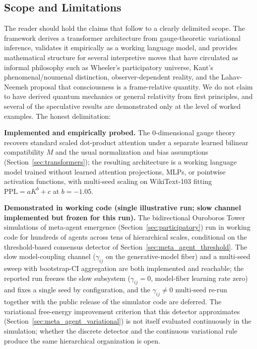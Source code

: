 \documentclass[11pt]{article}
\begin{document}
\subsection{Scope and Limitations}
\label{sec:scope_limitations}

The reader should hold the claims that follow to a clearly delimited scope. The framework derives a transformer architecture from gauge-theoretic variational inference, validates it empirically as a working language model, and provides mathematical structure for several interpretive moves that have circulated as informal philosophy such as  Wheeler's participatory universe, Kant's phenomenal/noumenal distinction, observer-dependent reality, and the Lahav-Neemeh proposal that consciousness is a frame-relative quantity. We do not claim to have derived quantum mechanics or general relativity from first principles, and several of the speculative results are demonstrated only at the level of worked examples. The honest delimitation:

\textbf{Implemented and empirically probed.} The 0-dimensional gauge theory recovers standard scaled dot-product attention under a separate learned bilinear compatibility $M$ and the usual normalization and bias assumptions (Section~\ref{sec:transformers}); the resulting architecture is a working language model trained without learned attention projections, MLPs, or pointwise activation functions, with multi-seed scaling on WikiText-103 fitting $\mathrm{PPL} = aK^b + c$ at $b = -1.05$.

\textbf{Demonstrated in working code (single illustrative run; slow channel implemented but frozen for this run).} The bidirectional Ouroboros Tower simulations of meta-agent emergence (Section~\ref{sec:participatory}) run in working code for hundreds of agents across tens of hierarchical scales, conditional on the threshold-based consensus detector of Section~\ref{sec:meta_agent_threshold}. The slow model-coupling channel ($\gamma_{ij}$ on the generative-model fiber) and a multi-seed sweep with bootstrap-CI aggregation are both implemented and reachable; the reported run freezes the slow subsystem ($\gamma_{ij} = 0$, model-fiber learning rate zero) and fixes a single seed by configuration, and the $\gamma_{ij} \neq 0$ multi-seed re-run together with the public release of the simulator code are deferred. The variational free-energy improvement criterion that this detector approximates (Section~\ref{sec:meta_agent_variational}) is not itself evaluated continuously in the simulation; whether the discrete detector and the continuous variational rule produce the same hierarchical organization is open.
\end{document}
